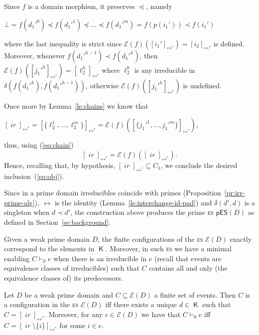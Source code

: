 \documentclass[conference]{IEEEtran}
\renewenvironment{proof}{\begin{IEEEproof}}{\end{IEEEproof}}
\newcommand{\compact}[1]{\ensuremath{\mathop{\mathsf{K}({#1})}}}
\newcommand{\ir}[1]{\ensuremath{\mathop{\mathit{ir}({#1})}}}
\newcommand{\diff}[2]{\ensuremath{\delta({#1},{#2})}}
\newcommand{\esabbr}{\textsc{es}}
\newcommand{\pred}[1]{\ensuremath{\mathit{p}({#1})}}
\newcommand{\eqclass}[2][]{\ensuremath{[{#2}]_{\scriptscriptstyle {#1}}}}
\newcommand{\eqclassir}[1]{\ensuremath{\eqclass[\leftrightarrow^*]{#1}}}
\newcommand{\pes}{\ensuremath{\mathsf{pES}}}
\newcommand{\zev}[0]{\ensuremath{\mathcal{E}}}
\newcommand{\ev}[1]{\ensuremath{\zev({#1})}}
\begin{document}
\begin{proof}
\begin{itemize}
     Since $f$ is a domain morphism, it preserves $\preceq$, namely
     \begin{center}
       $\bot = f(d_1'^0) \preceq f(d_1'^1) \preceq \ldots \preceq f(d_1'^m) =
       f(\pred{i_1'}) \prec f(i_1')$
     \end{center}
     where the last inequality is strict since
     $\ev{f}(\eqclassir{i_1'}) = \eqclassir{i_2}$ is
     defined. Moreover, whenever $f(d_1'^{h-1}) \prec f(d_1'^h)$, then
     $\ev{f}(\eqclassir{j_1'^h}) = \eqclassir{\ell_2^h}$ where $\ell_2^h$
     is any irreducible in $\diff{f(d_1'^h)}{f(d_1'^{h-1})}$, otherwise
     $\ev{f}(\eqclassir{j_1'^h})$ is undefined.

     Once more by Lemma~\ref{le:chains} we know that
     \begin{center}
       $\eqclassir{\ir{f(\pred{i_1'})}} = \eqclassir{\{\ell_2^1, \ldots,
         \ell_2^m\}} = \ev{f}(\eqclassir{\{j_1'^1, \ldots, j_1'^m\}})$,
     \end{center}
     thus, using (\ref{eq:chain})
     \begin{equation}
       \label{eq:chain1}
       \eqclassir{\ir{f(\pred{i_1'})}} =
       \ev{f}(\eqclassir{\ir{\pred{i_1'}}}).
     \end{equation}
     Hence, recalling that, by hypothesis,
     $\eqclassir{\ir{\pred{i_1'}}} \subseteq C_1$, we conclude the desired
     inclusion~(\ref{eq:obj}).
  \end{itemize}
\end{proof}





Since in a prime domain irreducibles coincide with
primes (Proposition~\ref{pr:irr-prime-alg}), $\leftrightarrow$ is the
identity (Lemma~\ref{le:interchange-id-pad}) and $\diff{d'}{d}$ is a
singleton when $d \prec d'$, the construction above produces the prime
{\esabbr} $\pes(D)$ as defined in Section~\ref{se:background}.


Given a weak prime domain $D$, the finite configurations of the {\esabbr}
$\ev{D}$ exactly correspond to the elements in
$\compact{D}$. Moreover, in such {\esabbr} we have a minimal enabling
$C \vdash_0 e$ when there is an irreducible in $e$ (recall that events
are equivalence classes of irreducibles) such that $C$ contains all and only
(the equivalence classes of) its predecessors.


\begin{lemma}
  \label{le:comp-conf}
  Let $D$ be a weak prime domain and $C \subseteq \ev{D}$ a finite set
  of events.  Then $C$ is a configuration in the {\esabbr} $\ev{D}$
  iff there exists a unique $d \in \compact{D}$ such that $C =
  \eqclassir{\ir{d}}$. Moreover, for any $e \in \ev{D}$ we have that
  $C \vdash_0 e$ iff $C = \eqclassir{\ir{i} \setminus \{ i \}}$ for
  some $i \in e$.
\end{lemma}
\end{document}
